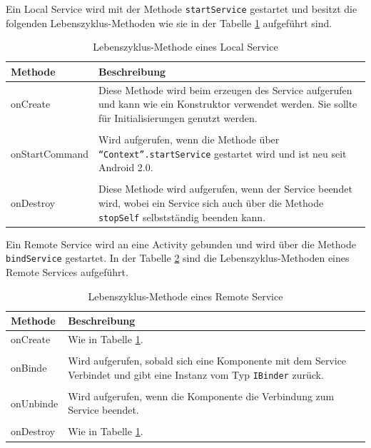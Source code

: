 Ein Local Service wird mit der Methode \texttt{startService} gestartet und besitzt die folgenden Lebenszyklus-Methoden wie sie in der Tabelle \ref{Lebenszyklus-Methode eines Local Service} aufgef\"uhrt sind.

\begin{table}[!ht]
\begin{tabular}{|p{3cm}|p{12cm}|}
 \hline Methode & Beschreibung \\
 \hline onCreate & Diese Methode wird beim erzeugen des Service aufgerufen und kann wie ein Konstruktor verwendet werden. Sie sollte f\"ur Initialisierungen genutzt werden.\\&\\
 onStartCommand & Wird aufgerufen, wenn die Methode \"uber \texttt{"`Context"'.startService} gestartet wird und ist neu seit Android 2.0.\\&\\
 onDestroy & Diese Methode wird aufgerufen, wenn der Service beendet wird, wobei ein Service sich auch \"uber die Methode \texttt{stopSelf} selbstst\"andig beenden kann.\\
 \hline
\end{tabular}
\caption{Lebenszyklus-Methode eines Local Service \cite{Android44}}
\label{Lebenszyklus-Methode eines Local Service}
\end{table}
\FloatBarrier

Ein Remote Service wird an eine Activity gebunden und wird \"uber die Methode \texttt{bindService} gestartet. In der Tabelle \ref{Lebenszyklus-Methode eines Remote Service} sind die Lebenszyklus-Methoden eines Remote Services aufgef\"uhrt.

\FloatBarrier
\begin{table}[!ht]
\begin{tabular}{|p{3cm}|p{12cm}|}
 \hline Methode & Beschreibung \\
 \hline onCreate & Wie in Tabelle \ref{Lebenszyklus-Methode eines Local Service}.\\&\\
 onBinde & Wird aufgerufen, sobald sich eine Komponente mit dem Service Verbindet und gibt eine Instanz vom Typ \texttt{IBinder} zur\"uck.\\&\\
 onUnbinde & Wird aufgerufen, wenn die Komponente die Verbindung zum Service beendet.\\&\\
 onDestroy & Wie in Tabelle \ref{Lebenszyklus-Methode eines Local Service}.\\
 \hline
\end{tabular}
\caption{Lebenszyklus-Methode eines Remote Service \cite{Android44}}
\label{Lebenszyklus-Methode eines Remote Service}
\end{table}
\FloatBarrier

